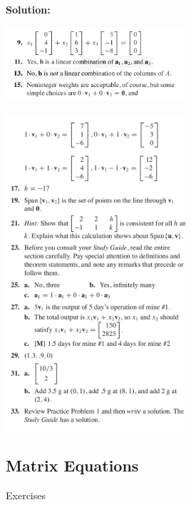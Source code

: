 \documentclass[a4paper,11pt,reqno]{amsart}
\numberwithin{equation}{section}
\begin{document}
\textbf{Solution:}

\includegraphics[width=0.5\textwidth]{exercises/ve_ans1.png}

\includegraphics[width=0.5\textwidth]{exercises/ve_ans2.png}

\newpage

\subsection{Matrix Equations}
Exercises
\end{document}
